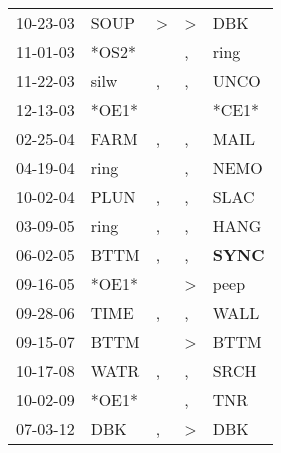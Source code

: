 \begin{supertabular}{p{0.07\textwidth}p{0.06\textwidth}p{0.02\textwidth}p{0.02\textwidth}p{0.06\textwidth}}
 10-23-03\textsuperscript{} &           SOUP\textsuperscript{} &  \textgreater &  \textgreater &            DBK\textsuperscript{} \\
 11-01-03\textsuperscript{} &                            *OS2* &               &             , &           ring\textsuperscript{} \\
 11-22-03\textsuperscript{} &           silw\textsuperscript{} &             , &             , &           UNCO\textsuperscript{} \\
 12-13-03\textsuperscript{} &                            *OE1* &               &               &                            *CE1* \\
 02-25-04\textsuperscript{} &           FARM\textsuperscript{} &             , &             , &           MAIL\textsuperscript{} \\
 04-19-04\textsuperscript{} &           ring\textsuperscript{} &               &             , &           NEMO\textsuperscript{} \\
 10-02-04\textsuperscript{} &           PLUN\textsuperscript{} &             , &             , &           SLAC\textsuperscript{} \\
 03-09-05\textsuperscript{} &           ring\textsuperscript{} &             , &             , &           HANG\textsuperscript{} \\
 06-02-05\textsuperscript{} &           BTTM\textsuperscript{} &             , &             , &  \textbf{SYNC\textsuperscript{}} \\
 09-16-05\textsuperscript{} &                            *OE1* &               &  \textgreater &           peep\textsuperscript{} \\
 09-28-06\textsuperscript{} &           TIME\textsuperscript{} &             , &             , &           WALL\textsuperscript{} \\
 09-15-07\textsuperscript{} &           BTTM\textsuperscript{} &               &  \textgreater &           BTTM\textsuperscript{} \\
 10-17-08\textsuperscript{} &           WATR\textsuperscript{} &             , &             , &           SRCH\textsuperscript{} \\
 10-02-09\textsuperscript{} &                            *OE1* &               &             , &            TNR\textsuperscript{} \\
 07-03-12\textsuperscript{} &            DBK\textsuperscript{} &             , &  \textgreater &            DBK\textsuperscript{} \\

\end{supertabular}

